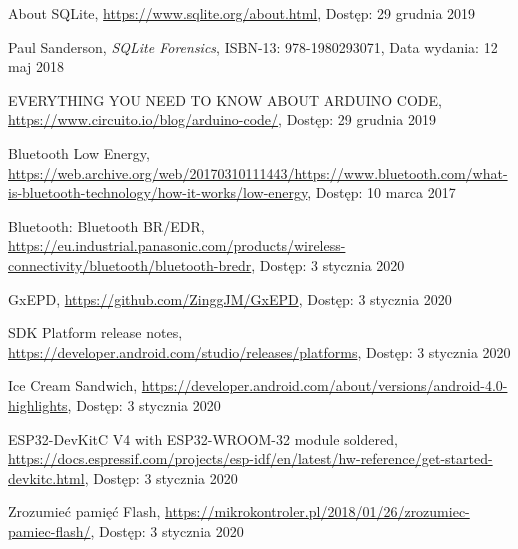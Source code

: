 \documentclass[a4paper,12pt, twoside]{article}
\begin{document}
\begin{thebibliography}{}
		About SQLite,
		\newline\url{https://www.sqlite.org/about.html}, 
		\newline Dostęp: 29 grudnia 2019
		
	    Paul Sanderson, \textit{SQLite Forensics}, ISBN-13: 978-1980293071,
		\newline Data wydania: 12 maj 2018
		
		EVERYTHING YOU NEED TO KNOW ABOUT ARDUINO CODE,
		\newline\url{https://www.circuito.io/blog/arduino-code/}, 
		\newline Dostęp: 29 grudnia 2019
		
		Bluetooth Low Energy,
		\newline\url{https://web.archive.org/web/20170310111443/https://www.bluetooth.com/what-is-bluetooth-technology/how-it-works/low-energy}, 
		\newline Dostęp: 10 marca 2017
		
		Bluetooth: Bluetooth BR/EDR,
		\newline\url{https://eu.industrial.panasonic.com/products/wireless-connectivity/bluetooth/bluetooth-bredr}, 
		\newline Dostęp: 3 stycznia 2020

		GxEPD,
		\newline\url{https://github.com/ZinggJM/GxEPD}, 
		\newline Dostęp: 3 stycznia 2020
		
		SDK Platform release notes,
		\newline\url{https://developer.android.com/studio/releases/platforms}, 
		\newline Dostęp: 3 stycznia 2020
		
		Ice Cream Sandwich,
		\newline\url{https://developer.android.com/about/versions/android-4.0-highlights}, 
		\newline Dostęp: 3 stycznia 2020
		
		ESP32-DevKitC V4 with ESP32-WROOM-32 module soldered,
		\newline\url{https://docs.espressif.com/projects/esp-idf/en/latest/hw-reference/get-started-devkitc.html}, 
		\newline Dostęp: 3 stycznia 2020
		
		Zrozumieć pamięć Flash,
		\newline\url{https://mikrokontroler.pl/2018/01/26/zrozumiec-pamiec-flash/}, 
		\newline Dostęp: 3 stycznia 2020
		

\end{thebibliography}
\end{document}
